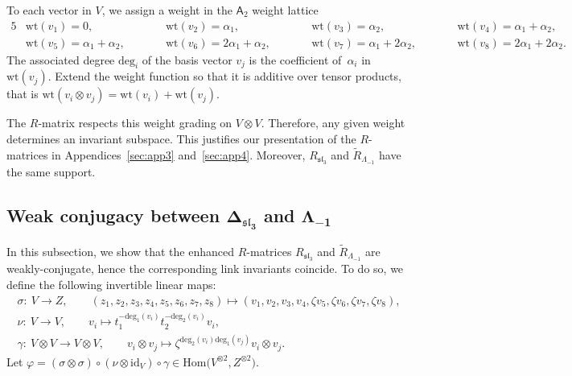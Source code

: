 \documentclass[10pt,a4paper]{amsart}
\numberwithin{equation}{section}
\theoremstyle{definition}
\begin{document}
To each vector in $V$, we assign a weight in the $\mathsf{A}_2$ weight lattice
\begin{alignat*}{5}
&\mathrm{wt}(v_1)=0, \qquad\! && \mathrm{wt}(v_2)=\alpha_1, \qquad\! &&
\mathrm{wt}(v_3)=\alpha_2, \qquad\! && \mathrm{wt}(v_4)=\alpha_1+\alpha_2,&
\\
&\mathrm{wt}(v_5)=\alpha_1+\alpha_2, \qquad\! &&
\mathrm{wt}(v_6)=2\alpha_1+\alpha_2, \qquad\! &&
\mathrm{wt}(v_7)=\alpha_1+2\alpha_2, \qquad\! && \mathrm{wt}(v_8)=2\alpha_1+2\alpha_2.&
\end{alignat*}
The associated degree $\mathrm{deg}_{i}$ of the basis vector $v_j$ is the coefficient
of~$\alpha_i$ in $\mathrm{wt}(v_j)$. Extend the weight function so that it is additive over
tensor products, that is $\mathrm{wt}(v_i\otimes v_j)=\mathrm{wt}(v_i)+\mathrm{wt}(v_j)$.

The $R$-matrix respects this weight grading on $V\otimes V$. Therefore, any given
weight determines an invariant subspace. This justifies our presentation of the
$R$-matrices in Appendices~\ref{sec:app3} and~\ref{sec:app4}. Moreover,
$R_{\mathfrak{sl}_3}$ and $\tilde{R}_{\Lambda_{-1}}$ have the same support.

\subsection[Weak conjugacy between Delta\_\{sl\_3\} and Lambda\_\{-1\}]{Weak conjugacy between $\boldsymbol{\Delta_{\mathfrak{sl}_3}}$ and $\boldsymbol{\Lambda_{-1}}$}

In this subsection, we show that the enhanced $R$-matrices $R_{\mathfrak{sl}_3}$
and $\tilde{R}_{\Lambda_{-1}}$ are weakly-conjugate, hence the corresponding
link invariants coincide. To do so, we define the following invertible linear maps:
\begin{gather*}
\sigma \colon \ V \to Z, \qquad (z_1 ,z_2 ,z_3 ,z_4 ,z_5 ,z_6 ,z_7 ,z_8)
\mapsto (v_1 ,v_2 ,v_3 ,v_4 ,\zeta v_5 ,\zeta v_6 ,\zeta v_7 , \zeta v_8),
\\
\nu \colon \ V\to V, \qquad v_i \mapsto t_1^{-\mathrm{deg}_{1}(v_i)}t_2^{-\mathrm{deg}_{2}(v_i)}v_i,
\\
\gamma \colon \ V \otimes V \to V \otimes V,\qquad
v_i\otimes v_j \mapsto \zeta^{\mathrm{deg}_{2}(v_i)\mathrm{deg}_{1}(v_j)}v_i\otimes v_j .
\end{gather*}
Let $\varphi=(\sigma\otimes\sigma)\circ (\nu\otimes \mathrm{id}_V)\circ \gamma \in \mathrm{Hom}\bigl(V^{\otimes 2},Z^{\otimes 2}\bigr)$.
\end{document}
